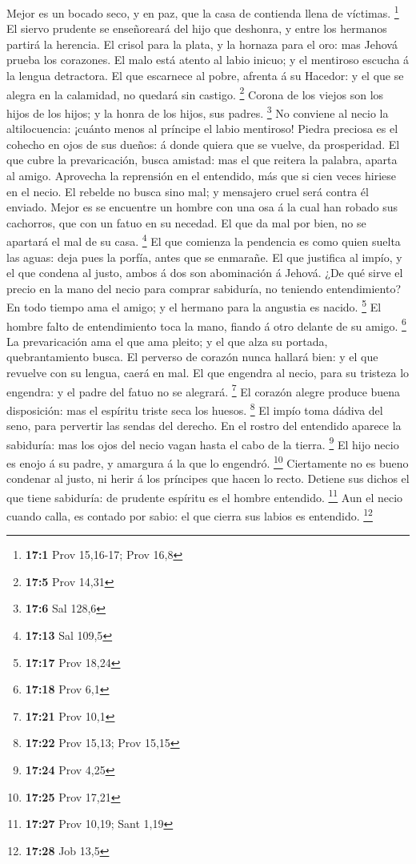  Mejor es un bocado seco, y en paz, que la casa de contienda
llena de víctimas. \footnote{\textbf{17:1} Prov 15,16-17; Prov 16,8}
 El siervo prudente se enseñoreará del hijo que deshonra, y
entre los hermanos partirá la herencia.  El crisol para la
plata, y la hornaza para el oro: mas Jehová prueba los corazones.
 El malo está atento al labio inicuo; y el mentiroso escucha
á la lengua detractora.  El que escarnece al pobre, afrenta
á su Hacedor: y el que se alegra en la calamidad, no quedará sin
castigo. \footnote{\textbf{17:5} Prov 14,31}  Corona de los
viejos son los hijos de los hijos; y la honra de los hijos, sus padres.
\footnote{\textbf{17:6} Sal 128,6}  No conviene al necio la
altilocuencia: ¡cuánto menos al príncipe el labio mentiroso!
 Piedra preciosa es el cohecho en ojos de sus dueños: á
donde quiera que se vuelve, da prosperidad.  El que cubre la
prevaricación, busca amistad: mas el que reitera la palabra, aparta al
amigo.  Aprovecha la reprensión en el entendido, más que si
cien veces hiriese en el necio.  El rebelde no busca sino
mal; y mensajero cruel será contra él enviado.  Mejor es se
encuentre un hombre con una osa á la cual han robado sus cachorros, que
con un fatuo en su necedad.  El que da mal por bien, no se
apartará el mal de su casa. \footnote{\textbf{17:13} Sal 109,5}
 El que comienza la pendencia es como quien suelta las
aguas: deja pues la porfía, antes que se enmarañe.  El que
justifica al impío, y el que condena al justo, ambos á dos son
abominación á Jehová.  ¿De qué sirve el precio en la mano
del necio para comprar sabiduría, no teniendo entendimiento?
 En todo tiempo ama el amigo; y el hermano para la angustia
es nacido. \footnote{\textbf{17:17} Prov 18,24}  El hombre
falto de entendimiento toca la mano, fiando á otro delante de su amigo.
\footnote{\textbf{17:18} Prov 6,1}  La prevaricación ama el
que ama pleito; y el que alza su portada, quebrantamiento busca.
 El perverso de corazón nunca hallará bien: y el que
revuelve con su lengua, caerá en mal.  El que engendra al
necio, para su tristeza lo engendra: y el padre del fatuo no se
alegrará. \footnote{\textbf{17:21} Prov 10,1}  El corazón
alegre produce buena disposición: mas el espíritu triste seca los
huesos. \footnote{\textbf{17:22} Prov 15,13; Prov 15,15} 
El impío toma dádiva del seno, para pervertir las sendas del derecho.
 En el rostro del entendido aparece la sabiduría: mas los
ojos del necio vagan hasta el cabo de la tierra. \footnote{\textbf{17:24}
  Prov 4,25}  El hijo necio es enojo á su padre, y amargura
á la que lo engendró. \footnote{\textbf{17:25} Prov 17,21} 
Ciertamente no es bueno condenar al justo, ni herir á los príncipes que
hacen lo recto.  Detiene sus dichos el que tiene sabiduría:
de prudente espíritu es el hombre entendido. \footnote{\textbf{17:27}
  Prov 10,19; Sant 1,19}  Aun el necio cuando calla, es
contado por sabio: el que cierra sus labios es entendido. \footnote{\textbf{17:28}
  Job 13,5}

